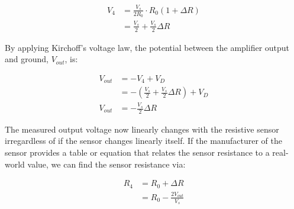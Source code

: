 \begin{align*}
    V_4 &= \frac{V_s}{2R_0} \cdot R_0(1+\Delta R) \\
        &= \frac{V_s}{2} + \frac{V_s}{2} \Delta R
\end{align*}

By applying Kirchoff's voltage law, the potential between the amplifier output and ground, $V_{out} $, is:

\begin{align*}
    V_{out} &= -V_4 + V_D \\
            &= -\left( \frac{V_s}{2} + \frac{V_s}{2} \Delta R\right) + V_D \\
    V_{out} &= -\frac{V_s}{2} \Delta R
\end{align*}

The measured output voltage now linearly changes with the resistive sensor irregardless of if the sensor changes linearly itself.
If the manufacturer of the sensor provides a table or equation that relates the sensor resistance to a real-world value, we can find the sensor resistance via:

\begin{align*}
    R_4 &= R_0 + \Delta R \\
        &= R_0 - \frac{2V_{out}}{V_s}
\end{align*}